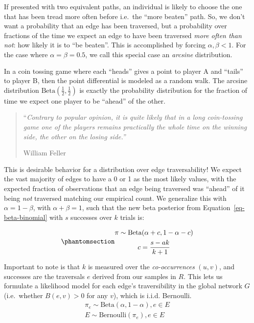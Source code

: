 \documentclass[%
	12pt,
		oneside,
		letterpaper
]{book}
\begin{document}
If presented with two equivalent paths, an individual is likely to
choose the one that has been tread more often before i.e.~the ``more
beaten'' path. So, we don't want a probability that an edge has been
traversed, but a probability over fractions of the time we expect an
edge to have been traversed \emph{more often than not}: how likely it is
to ``be beaten''. This is accomplished by forcing \(\alpha, \beta < 1\).
For the case where \(\alpha=\beta=0.5\), we call this special case an
\emph{arcsine} distribution.

In a coin tossing game where each ``heads'' gives a point to player A
and ``tails'' to player B, then the point differential is modeled as a
random walk. The arcsine distribution
\(\text{Beta}(\tfrac{1}{2},\tfrac{1}{2})\) is exactly the probability
distribution for the fraction of time we expect one player to be
``ahead'' of the other. \autocite{WhatisArcsine_Ackelsberg2018}

\begin{quote}
``\emph{Contrary to popular opinion, it is quite likely that in a long
coin-tossing game one of the players remains practically the whole time
on the winning side, the other on the losing side.''}

William Feller\autocite[Chapter
III]{IntroductionProbabilityTheory_Feller1968}
\end{quote}

This is desirable behavior for a distribution over edge traversability!
We expect the vast majority of edges to have a 0 or 1 as the most likely
values, with the expected fraction of observations that an edge being
traversed was ``ahead'' of it being \emph{not} traversed matching our
empirical count. We generalize this with \(\alpha = 1-\beta\), with
\(\alpha + \beta = 1\), such that the new beta posterior from
Equation~\ref{eq-beta-binomial} with \(s\) successes over \(k\) trials
is:

\begin{equation}\phantomsection\label{eq-desirepath-binom}{
\begin{gathered}
\pi \sim \text{Beta}(\alpha + c, 1-\alpha-c) \\
c = \frac{s-ak}{k+1}\\
\end{gathered}
}\end{equation}

Important to note is that \(k\) is measured over the
\emph{co-occurrences} \((u,v)\), and successes are the traversals \(e\)
derived from our samples in \(R\). This lets us formulate a likelihood
model for each edge's traversibility in the global network \(G\)
(i.e.~whether \(B(e,v)>0\) for any \(v\)), which is i.i.d. Bernoulli. \[
\begin{gathered}
\pi_e \sim \text{Beta}(\alpha, 1-\alpha), e\in E\\ 
E \sim \text{Bernoulli}(\pi_e), e \in E
\end{gathered}
\]
\end{document}

